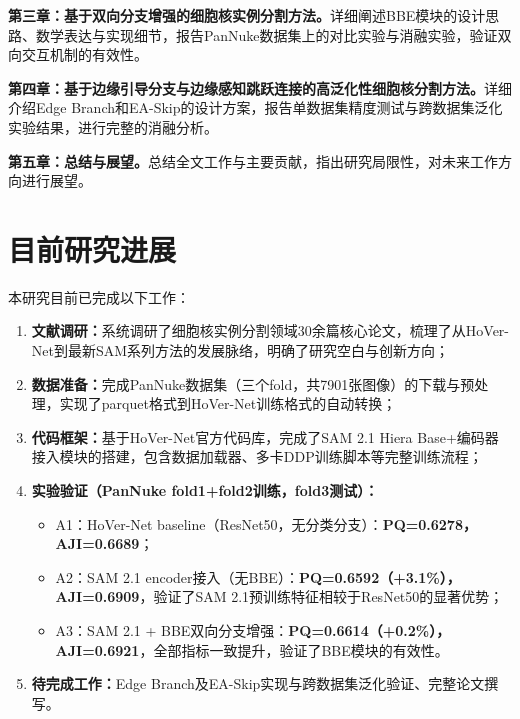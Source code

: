 \documentclass{sufethesismas}
\begin{document}
\textbf{第三章：基于双向分支增强的细胞核实例分割方法。}详细阐述BBE模块的设计思路、数学表达与实现细节，报告PanNuke数据集上的对比实验与消融实验，验证双向交互机制的有效性。

\textbf{第四章：基于边缘引导分支与边缘感知跳跃连接的高泛化性细胞核分割方法。}详细介绍Edge Branch和EA-Skip的设计方案，报告单数据集精度测试与跨数据集泛化实验结果，进行完整的消融分析。

\textbf{第五章：总结与展望。}总结全文工作与主要贡献，指出研究局限性，对未来工作方向进行展望。

\section{目前研究进展}

本研究目前已完成以下工作：

\begin{enumerate}
  \item \textbf{文献调研：}系统调研了细胞核实例分割领域30余篇核心论文，梳理了从HoVer-Net到最新SAM系列方法的发展脉络，明确了研究空白与创新方向；

  \item \textbf{数据准备：}完成PanNuke数据集（三个fold，共7901张图像）的下载与预处理，实现了parquet格式到HoVer-Net训练格式的自动转换；

  \item \textbf{代码框架：}基于HoVer-Net官方代码库，完成了SAM 2.1 Hiera Base+编码器接入模块的搭建，包含数据加载器、多卡DDP训练脚本等完整训练流程；

  \item \textbf{实验验证（PanNuke fold1+fold2训练，fold3测试）：}
    \begin{itemize}
      \item A1：HoVer-Net baseline（ResNet50，无分类分支）：\textbf{PQ=0.6278，AJI=0.6689}；
      \item A2：SAM 2.1 encoder接入（无BBE）：\textbf{PQ=0.6592（+3.1\%），AJI=0.6909}，验证了SAM 2.1预训练特征相较于ResNet50的显著优势；
      \item A3：SAM 2.1 + BBE双向分支增强：\textbf{PQ=0.6614（+0.2\%），AJI=0.6921}，全部指标一致提升，验证了BBE模块的有效性。
    \end{itemize}

  \item \textbf{待完成工作：}Edge Branch及EA-Skip实现与跨数据集泛化验证、完整论文撰写。
\end{enumerate}


\end{document}
